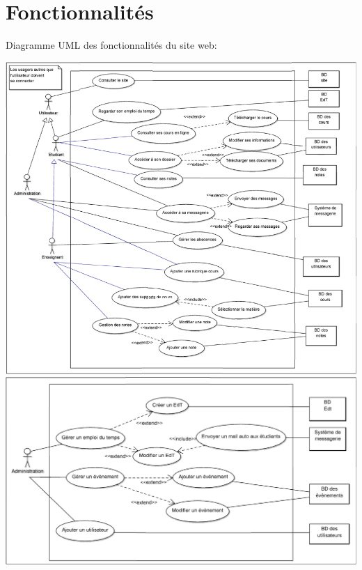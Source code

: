 \documentclass[oneside]{report}
\begin{document}
{		\section{Fonctionnalités}
		{
			\par Diagramme UML des fonctionnalités du site web:\\
			\begin{center}
				\includegraphics[scale=1.5]{uml_base}
				\\ \vspace{1cm}
				\includegraphics[scale=1.5]{uml_admin}
			\end{center}
		}
	}
\end{document}
